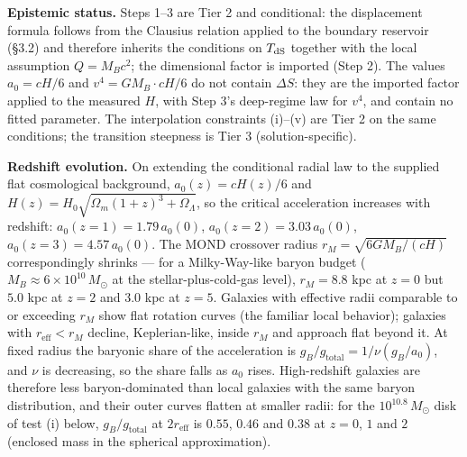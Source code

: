 \documentclass[
]{article}
\begin{document}
\textbf{Epistemic status.} Steps 1--3 are Tier 2 and conditional: the
displacement formula follows from the Clausius relation applied to the
boundary reservoir (§3.2) and therefore inherits the conditions on
\(T_{\rm dS}\) together with the local assumption \(Q = M_Bc^2\); the
dimensional factor is imported (Step 2). The values \(a_0 = cH/6\) and
\(v^4 = GM_B \cdot cH/6\) do not contain \(\Delta S\): they are the
imported factor applied to the measured \(H\), with Step 3's deep-regime
law for \(v^4\), and contain no fitted parameter. The interpolation
constraints (i)--(v) are Tier 2 on the same conditions; the transition
steepness is Tier 3 (solution-specific).

\textbf{Redshift evolution.} On extending the conditional radial law to
the supplied flat cosmological background, \(a_0(z) = cH(z)/6\) and
\(H(z) = H_0\sqrt{\Omega_m(1+z)^3 + \Omega_\Lambda}\), so the critical
acceleration increases with redshift: \(a_0(z=1) = 1.79\,a_0(0)\),
\(a_0(z=2) = 3.03\,a_0(0)\), \(a_0(z=3) = 4.57\,a_0(0)\). The MOND
crossover radius \(r_M = \sqrt{6GM_B/(cH)}\) correspondingly shrinks ---
for a Milky-Way-like baryon budget
(\(M_B \approx 6 \times 10^{10}\,M_\odot\) at the stellar-plus-cold-gas
level), \(r_M = 8.8\) kpc at \(z = 0\) but \(5.0\) kpc at \(z = 2\) and
\(3.0\) kpc at \(z = 5\). Galaxies with effective radii comparable to or
exceeding \(r_M\) show flat rotation curves (the familiar local
behavior); galaxies with \(r_{\text{eff}} < r_M\) decline,
Keplerian-like, inside \(r_M\) and approach flat beyond it. At fixed
radius the baryonic share of the acceleration is
\(g_B/g_{\text{total}} = 1/\nu(g_B/a_0)\), and \(\nu\) is decreasing, so
the share falls as \(a_0\) rises. High-redshift galaxies are therefore
less baryon-dominated than local galaxies with the same baryon
distribution, and their outer curves flatten at smaller radii: for the
\(10^{10.8}\,M_\odot\) disk of test (i) below, \(g_B/g_{\text{total}}\)
at \(2r_{\text{eff}}\) is \(0.55\), \(0.46\) and \(0.38\) at \(z = 0\),
\(1\) and \(2\) (enclosed mass in the spherical approximation).
\end{document}
